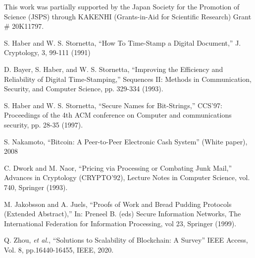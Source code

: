 \documentclass[graybox]{svmult}
\begin{document}
\begin{acknowledgement}
 This work was partially supported by the Japan Society for the Promotion of Science (JSPS) through KAKENHI (Grants-in-Aid for Scientific Research) Grant \# 20K11797. 
\end{acknowledgement}




\vspace{-5mm}
\begin{thebibliography}{99}

  S. Haber and W. S. Stornetta, 
  ``How To Time-Stamp a Digital Document,''
  J. Cryptology, 3, 99-111 (1991)

  D. Bayer, S. Haber, and W. S. Stornetta,
  ``Improving the Efficiency and Reliability of Digital Time-Stamping,''
  Sequences II: Methods in Communication, Security, and Computer Science, 
  pp. 329-334 (1993).

  S. Haber and W. S. Stornetta, 
  ``Secure Names for Bit-Strings,''
  CCS'97: Proceedings of the 4th ACM conference on Computer and 
  communications security, pp. 28-35 (1997).


  S. Nakamoto, 
  ``Bitcoin: A Peer-to-Peer Electronic Cash System''
  (White paper), 2008 


  C. Dwork and M. Naor, 
  ``Pricing via Processing or Combating Junk Mail,''
  Advances in Cryptology (CRYPTO'92), 
  Lecture Notes in Computer Science, vol. 740, Springer (1993). 


  M. Jakobsson and A. Juels, 
  ``Proofs of Work and Bread Pudding Protocols (Extended Abstract),''
  In: Preneel B. (eds) Secure Information Networks, 
  The International Federation for Information Processing, 
  vol 23, Springer (1999).




  Q. Zhou, \textit{et al.}, 
  ``Solutions to Scalability of Blockchain: A Survey''
  IEEE Access, Vol. 8, pp.16440-16455, IEEE, 2020. 



\end{thebibliography}
\end{document}
